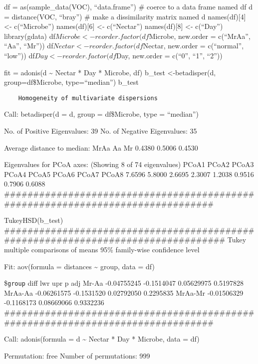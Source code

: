 \documentclass[]{article}
\begin{document}
df = as(sample\_data(VOC), ``data.frame'') \# coerce to a data frame
named df d = distance(VOC, ``bray'') \# make a dissimilarity matrix
named d names(df){[}4{]} \textless{}- c(``Microbe'') names(df){[}6{]}
\textless{}- c(``Nectar'') names(df){[}8{]} \textless{}- c(``Day'')
library(gdata) df\(Microbe <- reorder.factor(df\)Microbe, new.order =
c(``MrAa'', ``Aa'', ``Mr'')) df\(Nectar <- reorder.factor(df\)Nectar,
new.order = c(``normal'', ``low'')) df\(Day <- reorder.factor(df\)Day,
new.order = c(``0'', ``1'', ``2''))

fit = adonis(d \textasciitilde{} Nectar * Day * Microbe, df) b\_test
\textless{}-betadisper(d, group=df\$Microbe, type=``median'') b\_test

\begin{verbatim}
    Homogeneity of multivariate dispersions
\end{verbatim}

Call: betadisper(d = d, group = df\$Microbe, type = ``median'')

No. of Positive Eigenvalues: 39 No. of Negative Eigenvalues: 35

Average distance to median: MrAa Aa Mr 0.4380 0.5006 0.4530

Eigenvalues for PCoA axes: (Showing 8 of 74 eigenvalues) PCoA1 PCoA2
PCoA3 PCoA4 PCoA5 PCoA6 PCoA7 PCoA8 7.6596 5.8000 2.6695 2.3007 1.2038
0.9516 0.7906 0.6088
\#\#\#\#\#\#\#\#\#\#\#\#\#\#\#\#\#\#\#\#\#\#\#\#\#\#\#\#\#\#\#\#\#\#\#\#\#\#\#\#\#\#\#\#\#\#\#\#\#\#\#\#\#\#\#\#\#\#\#\#\#\#\#\#\#\#\#\#\#\#\#\#\#\#\#\#\#\#\#

TukeyHSD(b\_test)
\#\#\#\#\#\#\#\#\#\#\#\#\#\#\#\#\#\#\#\#\#\#\#\#\#\#\#\#\#\#\#\#\#\#\#\#\#\#\#\#\#\#\#\#\#\#\#\#\#\#\#\#\#\#\#\#\#\#\#\#\#\#\#\#\#\#\#\#\#\#\#\#\#\#\#\#\#\#\#\#\#
Tukey multiple comparisons of means 95\% family-wise confidence level

Fit: aov(formula = distances \textasciitilde{} group, data = df)

\$\texttt{group} diff lwr upr p adj Mr-Aa -0.04755245 -0.1514047
0.05629975 0.5197828 MrAa-Aa -0.06261575 -0.1531520 0.02792050 0.2295835
MrAa-Mr -0.01506329 -0.1168173 0.08669066 0.9332236
\#\#\#\#\#\#\#\#\#\#\#\#\#\#\#\#\#\#\#\#\#\#\#\#\#\#\#\#\#\#\#\#\#\#\#\#\#\#\#\#\#\#\#\#\#\#\#\#\#\#\#\#\#\#\#\#\#\#\#\#\#\#\#\#\#\#\#\#\#\#\#\#\#\#\#\#\#\#\#

Call: adonis(formula = d \textasciitilde{} Nectar * Day * Microbe, data
= df)

Permutation: free Number of permutations: 999
\end{document}
